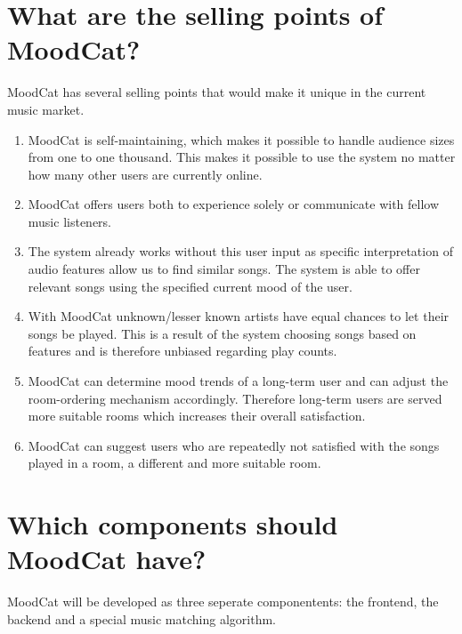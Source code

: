 \documentclass[10pt,a4paper]{article}
\begin{document}
\section{What are the selling points of MoodCat?}
MoodCat has several selling points that would make it unique in the current music market.

\begin{enumerate}
\item MoodCat is self-maintaining, which makes it possible to handle audience sizes from one to one thousand.
This makes it possible to use the system no matter how many other users are currently online.

\item MoodCat offers users both to experience solely or communicate with fellow music listeners.

\item The system already works without this user input as specific interpretation of audio features allow us to find similar songs.
The system is able to offer relevant songs using the specified current mood of the user.

\item With MoodCat unknown/lesser known artists have equal chances to let their songs be played.
This is a result of the system choosing songs based on features and is therefore unbiased regarding play counts.

\item MoodCat can determine mood trends of a long-term user and can adjust the room-ordering mechanism accordingly.
Therefore long-term users are served more suitable rooms which increases their overall satisfaction.

\item MoodCat can suggest users who are repeatedly not satisfied with the songs played in a room, a different and more suitable room.
\end{enumerate}

\section{Which components should MoodCat have?}
MoodCat will be developed as three seperate componentents: the frontend, the backend and a special music matching algorithm.
\end{document}
